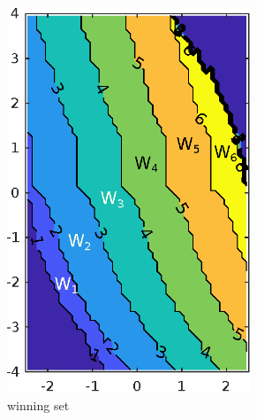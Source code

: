 \begin{figure}
	\centering
	\begin{subfigure}[b]{0.25\textwidth}
		\centering
		\includegraphics[width=0.8\textwidth]{pic/win-set}
		\caption{winning set}
		\label{fig:winset}
	\end{subfigure}
	\begin{subfigure}[b]{0.25\textwidth}
		\centering

\end{subfigure}
\end{figure}

